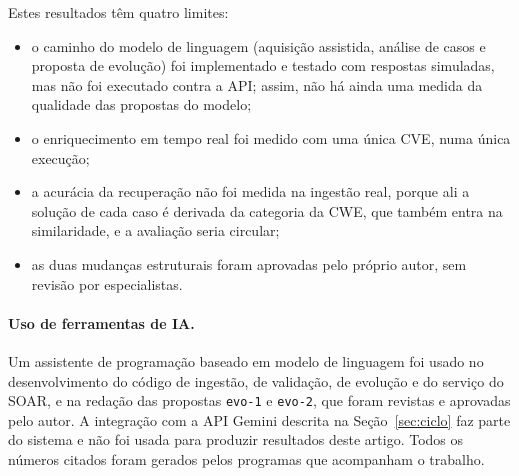 Estes resultados têm quatro limites:
\begin{itemize}
\item o caminho do modelo de linguagem (aquisição assistida, análise de casos e proposta de evolução) foi implementado e testado com respostas simuladas, mas não foi executado contra a API; assim, não há ainda uma medida da qualidade das propostas do modelo;
\item o enriquecimento em tempo real foi medido com uma única CVE, numa única execução;
\item a acurácia da recuperação não foi medida na ingestão real, porque ali a solução de cada caso é derivada da categoria da CWE, que também entra na similaridade, e a avaliação seria circular;
\item as duas mudanças estruturais foram aprovadas pelo próprio autor, sem revisão por especialistas.
\end{itemize}


\paragraph{Uso de ferramentas de IA.} Um assistente de programação baseado em modelo de linguagem foi usado no desenvolvimento do código de ingestão, de validação, de evolução e do serviço do SOAR, e na redação das propostas \texttt{evo-1} e \texttt{evo-2}, que foram revistas e aprovadas pelo autor. A integração com a API Gemini descrita na Seção~\ref{sec:ciclo} faz parte do sistema e não foi usada para produzir resultados deste artigo. Todos os números citados foram gerados pelos programas que acompanham o trabalho.
